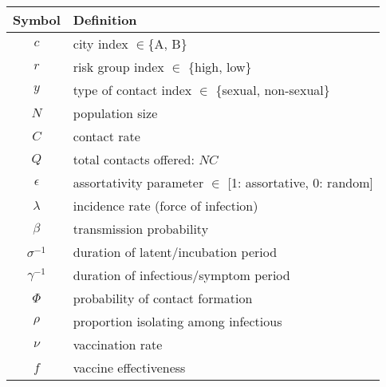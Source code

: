 \begin{tabular}{cl}
  \toprule
     Symbol     & Definition                                                \\
  \midrule
       $c$      & city index $\in$\{A, B\}                                  \\
       $r$      & risk group index $\in$ \{high, low\}                      \\
       $y$      & type of contact index $\in$ \{sexual, non-sexual\}        \\[1ex]
       $N$      & population size                                           \\
       $C$      & contact rate                                              \\
       $Q$      & total contacts offered: $NC$                              \\
   $\epsilon$   & assortativity parameter $\in$ [1: assortative, 0: random] \\[1ex]
    $\lambda$   & incidence rate (force of infection)                       \\
     $\beta$    & transmission probability                                  \\
  $\sigma^{-1}$ & duration of latent/incubation period                      \\
  $\gamma^{-1}$ & duration of infectious/symptom period                     \\
     $\Phi$     & probability of contact formation                          \\[1ex]
     $\rho$     & proportion isolating among infectious                     \\
      $\nu$     & vaccination rate                                          \\
       $f$      & vaccine effectiveness                                     \\
  \bottomrule
\end{tabular}